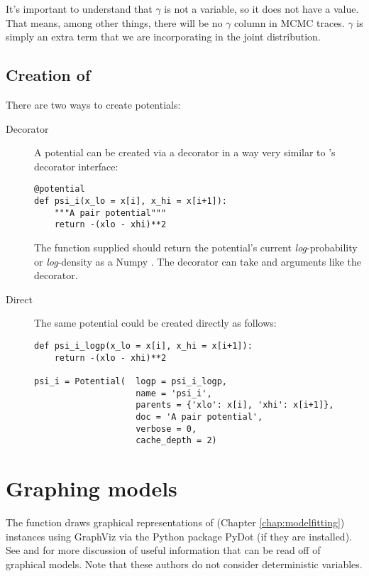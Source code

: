 It's important to understand that $\gamma$ is not a variable, so it does not have a value. That means, among other things, there will be no $\gamma$ column in MCMC traces. $\gamma$ is simply an extra term that we are incorporating in the joint distribution.


\subsection*[Creation of Potentials]{Creation of }
There are two ways to create potentials:
\begin{description}
    \item[Decorator] A potential can be created via a decorator in a way very similar to 's decorator interface:
\begin{verbatim}
@potential
def psi_i(x_lo = x[i], x_hi = x[i+1]):
    """A pair potential"""
    return -(xlo - xhi)**2
\end{verbatim}
The function supplied should return the potential's current \emph{log}-probability or \emph{log}-density as a Numpy . The  decorator can take  and  arguments like the  decorator.
    \item[Direct] The same potential could be created directly as follows:
\begin{verbatim}
def psi_i_logp(x_lo = x[i], x_hi = x[i+1]):
    return -(xlo - xhi)**2
        
psi_i = Potential(  logp = psi_i_logp, 
                    name = 'psi_i',
                    parents = {'xlo': x[i], 'xhi': x[i+1]},
                    doc = 'A pair potential',
                    verbose = 0,
                    cache_depth = 2)
\end{verbatim}
\end{description}


\hypertarget{graphical}{}
\section*{Graphing models} \label{graphical}

The function  draws graphical representations of  (Chapter \ref{chap:modelfitting}) instances using GraphViz via the Python package PyDot (if they are installed). See \cite{dawidmarkov} and \cite{Jordan:2004p5439} for more discussion of useful information that can be read off of graphical models. Note that these authors do not consider deterministic variables.

